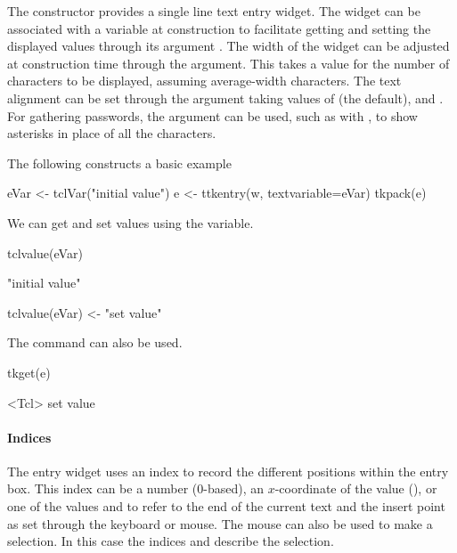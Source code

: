 The  constructor provides a single line text
entry widget. The widget can be associated with a \TCL\/ variable at
construction to facilitate getting and setting the displayed values
through its argument . The width of
the widget can be adjusted at construction time through the
 argument. This takes a value for the number
of characters to be displayed, assuming average-width characters.  The
text alignment can be set through the 
argument taking values of  (the default), 
and . For gathering passwords, the argument
 can be used, such as with
\qcode{*}, to show asterisks in place of all the
characters.

The following constructs a basic example
\begin{Schunk}
\begin{Sinput}
 eVar <- tclVar("initial value")
 e <- ttkentry(w, textvariable=eVar)
 tkpack(e)
\end{Sinput}
\end{Schunk}

We can get and set values using the \TCL\/ variable.
\begin{Schunk}
\begin{Sinput}
 tclvalue(eVar)
\end{Sinput}
\begin{Soutput}
[1] "initial value"
\end{Soutput}
\begin{Sinput}
 tclvalue(eVar) <- "set value"
\end{Sinput}
\end{Schunk}

The  command can also be used.
\begin{Schunk}
\begin{Sinput}
 tkget(e)
\end{Sinput}
\begin{Soutput}
<Tcl> set value 
\end{Soutput}
\end{Schunk}

\paragraph{Indices}
The entry widget uses an index to record the different positions
within the entry box. This index can be a number (0-based), an
$x$-coordinate of the value (), or one of the values
 and  to refer to the end of the current text
and the insert point as set through the keyboard or mouse. The mouse
can also be used to make a selection. In this case the indices
 and  describe the selection.

